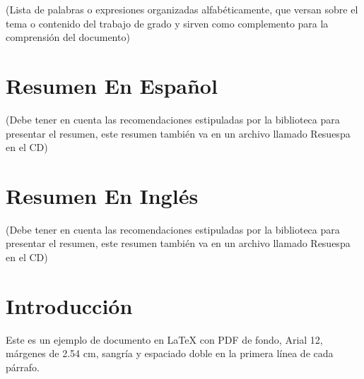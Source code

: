 \documentclass[11pt,openany]{book}
\renewcommand{\headrulewidth}{0pt}
\renewcommand{\headrulewidth}{0pt}%
\renewcommand{\footrulewidth}{0pt}%
\begin{document}
\begin{center}
    (Lista de palabras o expresiones organizadas alfabéticamente, que versan sobre el tema o contenido del trabajo de grado y sirven como complemento para la comprensión del documento)
\end{center}

\newpage

\chapter*{Resumen En Español}

\thispagestyle{fancy}
\fancyhf{}
   \chead{} \rhead{\thepage}
    \lfoot{}{} \cfoot{} \rfoot{}
    \renewcommand{\headrulewidth}{0pt}
  \renewcommand{\footrulewidth}{0pt}

\begin{center}
    (Debe tener en cuenta las recomendaciones estipuladas por la biblioteca para presentar el resumen, este resumen también va en un archivo llamado Resuespa en el CD)
\end{center}

\newpage

\chapter*{Resumen En Inglés}

\thispagestyle{fancy}
\fancyhf{}
   \chead{} \rhead{\thepage}
    \lfoot{}{} \cfoot{} \rfoot{}
    \renewcommand{\headrulewidth}{0pt}
  \renewcommand{\footrulewidth}{0pt}

\begin{center}
    (Debe tener en cuenta las recomendaciones estipuladas por la biblioteca para presentar el resumen, este resumen también va en un archivo llamado Resuespa en el CD)
\end{center}

\newpage

\doublespacing

\chapter{Introducción}

\thispagestyle{fancy}
\fancyhf{}
   \chead{} \rhead{\thepage}
    \lfoot{}{} \cfoot{} \rfoot{}
    \renewcommand{\headrulewidth}{0pt}
  \renewcommand{\footrulewidth}{0pt}

Este es un ejemplo de documento en LaTeX con PDF de fondo, Arial 12, márgenes de 2.54 cm, sangría y espaciado doble en la primera línea de cada párrafo.
\end{document}

